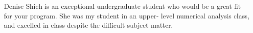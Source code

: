 \documentclass{amsart}
\begin{document}
Denise Shieh is an exceptional undergraduate student who would be a great fit
for your program. She was my student in an upper- level numerical analysis
class, and excelled in class despite the difficult subject matter.
\end{document}
